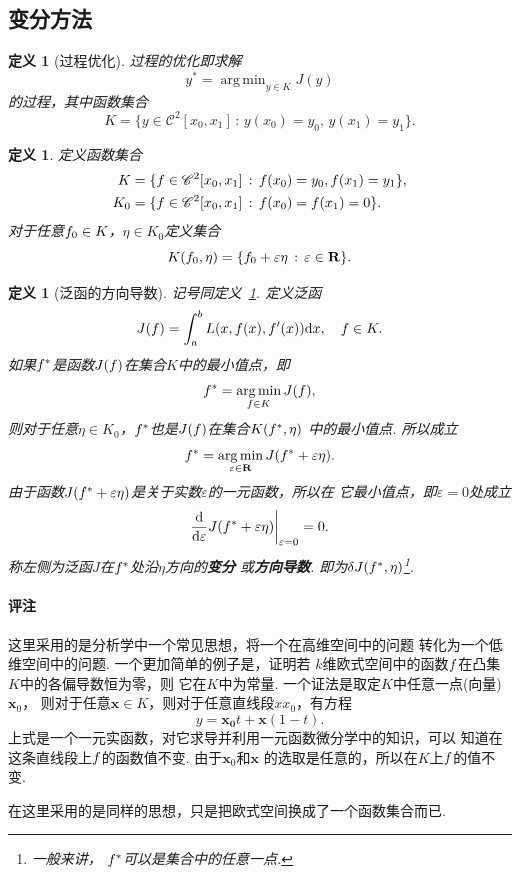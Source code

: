 \documentclass[12pt, a4paper]{article}
\theoremstyle{margin}
\newtheorem{defi}[thm]{定义}
\DeclareMathOperator*{\agm}{arg\,min}
\newcommand{\hp}{^\prime}
\newcommand{\ms}{\mathscr}
\newcommand{\tbf}{\textbf}
\newcommand{\mbf}{\mathbf}
\newcommand{\f}{\mathnormal{f}}
\newcommand{\R}{\mathbf{R}}
\newcommand{\rd}{\mathrm{d}}
\newcommand{\vep}{\varepsilon}
\newcommand\defref[1]{定义~\ref{#1}}
\newcommand{\remark}{\paragraph{评注}}
\begin{document}
\newpage
\subsection{变分方法}
  \begin{defi}[过程优化]
    \label{def: 过程优化}
    过程的优化即求解
    \[
      \label{equ: 过程优化}
      y^* = \agm_{y\in K}J(y)
    \]
    的过程，其中函数集合
    \[
      K = \{y\in\ms{C}^2[x_0, x_1]\,:\, y(x_0)=y_0,\,y(x_1)=y_1\}.
    \]
  \end{defi}

  \begin{defi}
    \label{defi: K}
    定义函数集合
    \[\begin{split}
      K &= \{\f\in\ms{C}^2[x_0, x_1]\,:\,\f(x_0)=y_0,
      \f(x_1) = y_1\}, \\
      K_0 &=\{\f\in\ms{C}^2[x_0, x_1]\,:\,\f(x_0)=
      \f(x_1) = 0\}.
    \end{split}\]
    对于任意$\f_0\in K$，$\eta \in K_0$定义集合
    \[
      K(\f_0, \eta) = \{\f_0 + \vep\eta\,:\,\vep\in\R\}.
    \]
  \end{defi}

  \begin{defi}[泛函的方向导数]
    \label{def: 泛函的方向导数}
    记号同\defref{defi: K}. 定义泛函
    \[
      J(\f) = \int_a^bL(x, \f(x), \f\hp(x)) \rd x,\quad
      \f \in K.
    \]
    如果$\f^*$是函数$J(\f)$在集合$K$中的最小值点，即
    \[
      \f^* = \agm_{\f\in K}J(\f),
    \]
    则对于任意$\eta\in K_0$，$\f^*$也是$J(\f)$在集合$K(\f^*,\eta)$
    中的最小值点. 所以成立
    \[
      \f^* = \agm_{\vep\in\R}J(\f^* + \vep\eta).
    \]
    由于函数$J(\f^* + \vep\eta)$是关于实数$\vep$的一元函数，所以在
    它最小值点，即$\vep =0$处成立
    \begin{equation}
      \label{equ: 方向导数为零}
      \frac{\rd}{\rd\vep}J(\f^* + \vep\eta)\bigg|_{\vep =0}=0.
    \end{equation}
    称左侧为泛函$J$在$\f^*$处沿$\eta$方向的\tbf{变分}
    或\tbf{方向导数}. 即为$\delta J(\f^*, \eta)$\footnote{一般来讲，
    $\f^*$可以是集合中的任意一点. }.
  \end{defi}
  \remark
    这里采用的是分析学中一个常见思想，将一个在高维空间中的问题
    转化为一个低维空间中的问题. 一个更加简单的例子是，证明若
    $k$维欧式空间中的函数$\f$在凸集$K$中的各偏导数恒为零，则
    它在$K$中为常量. 一个证法是取定$K$中任意一点(向量)$\mbf{x}_0$，
    则对于任意$\mbf{x}\in K$，则对于任意直线段$xx_0$，有方程
    \[
      y = \mbf{x_0}t + \mbf{x}(1-t).
    \]
    上式是一个一元实函数，对它求导并利用一元函数微分学中的知识，可以
    知道在这条直线段上$\f$的函数值不变. 由于$\mbf{x}_0$和$\mbf{x}$
    的选取是任意的，所以在$K$上$\f$的值不变. \par
    在这里采用的是同样的思想，只是把欧式空间换成了一个函数集合而已.
\end{document}

